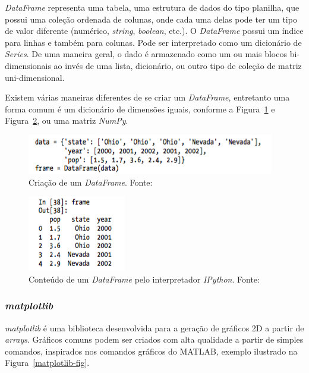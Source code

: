 \textit{DataFrame} representa uma tabela, uma estrutura de dados do tipo planilha, que possui uma coleção ordenada de colunas, onde cada uma delas pode ter um tipo de valor diferente (numérico, \textit{string}, \textit{boolean}, etc.). O \textit{DataFrame} possui um índice para linhas e também para colunas. Pode ser interpretado como um dicionário de \textit{Series}. De uma maneira geral, o dado é armazenado como um ou mais blocos bi-dimensionais ao invés de uma lista, dicionário, ou outro tipo de coleção de matriz uni-dimensional. \cite{python-analysis}

Existem várias maneiras diferentes de se criar um \textit{DataFrame}, entretanto uma forma comum é um dicionário de dimensões iguais, conforme a Figura~\ref{pandas-dataframe} e Figura~\ref{pandas-dataframe2},  ou uma matriz \textit{NumPy}.

\begin{figure}[h!]
	\centering
	\includegraphics{Cap4/imagens/pandas-dataframe}
	\caption{Criação de um \textit{DataFrame}. Fonte: }
	\label{pandas-dataframe}
\end{figure}

\begin{figure}[h!]
	\centering
	\includegraphics{Cap4/imagens/pandas-dataframe2}
	\caption{Conteúdo de um \textit{DataFrame} pelo interpretador \textit{IPython}. Fonte: }
	\label{pandas-dataframe2}
\end{figure}

\subsubsection{\textit{matplotlib}}
\textit{matplotlib} é uma biblioteca desenvolvida para a geração de gráficos 2D a partir de \textit{arrays}. Gráficos comuns podem ser criados com alta qualidade a partir de simples comandos, inspirados nos comandos gráficos do MATLAB, exemplo ilustrado na Figura~\ref{matplotlib-fig}.


